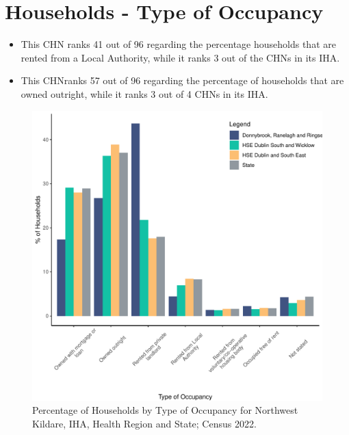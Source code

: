\documentclass{article}
\begin{document}
\section{Households - Type of Occupancy}\label{sect:Households}
\begin{itemize}
\item This CHN ranks  41 out of 96 regarding the percentage households that are rented from a Local Authority, while it ranks  3 out of the CHNs in its IHA. 
\item This CHNranks  57 out of 96 regarding the percentage of households that are owned outright, while it ranks   3 out of 4 CHNs in its IHA.
\end{itemize}
\begin{figure}[H]
	\centering
	\includegraphics[width = 140mm]{../figures/HouseholdsED.pdf}
	\caption{Percentage of Households by Type of Occupancy for Northwest Kildare, IHA, Health Region and State; Census 2022.}
	\label{fig:vbnv}
	\end{figure}
\end{document}
